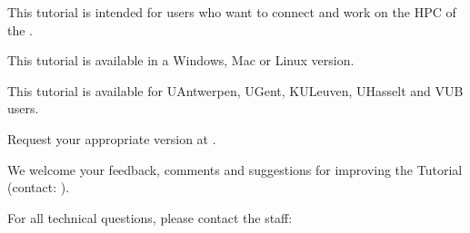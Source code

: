 This tutorial \strong{(\version)} is intended for users who want to connect and work on the HPC of the \strong{\university}.

This tutorial is available in a Windows, Mac or Linux version.

This tutorial is available for UAntwerpen, UGent, KULeuven, UHasselt and VUB users.

Request your appropriate version at \hpcinfo.


We welcome your feedback, comments and suggestions for improving the \hpc
Tutorial  (contact: \hpcinfo).

For all technical questions, please contact the \hpc staff:



